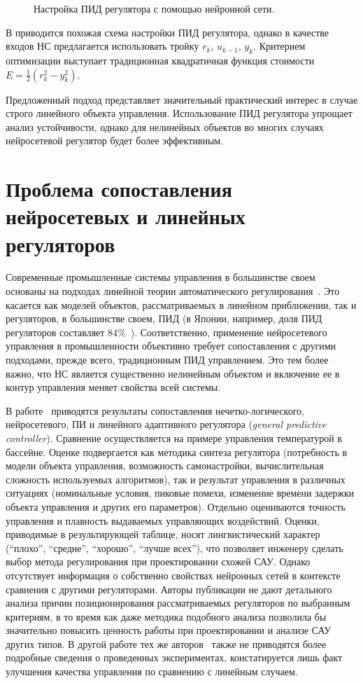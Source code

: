 \begin{figure}[h]
  \centering
  
  \caption{Настройка ПИД регулятора с помощью нейронной сети.}
  \label{fig:nn-tunes-pid}
\end{figure}

В \cite{sigom00} приводится похожая схема настройки ПИД регулятора,
однако в качестве входов НС предлагается использовать тройку $r_k$,
$u_{k-1}$, $y_k$.  Критерием оптимизации выступает традиционная
квадратичная функция стоимости $E=\frac{1}{2}(r_k^2-y_k^2)$.

Предложенный подход представляет значительный практический интерес в
случае строго линейного объекта управления.  Использование ПИД
регулятора упрощает анализ устойчивости, однако для нелинейных
объектов во многих случаях нейросетевой регулятор будет более
эффективным.


\section{Проблема сопоставления нейросетевых и линейных регуляторов}

Современные промышленные системы управления в большинстве своем
основаны на подходах линейной теории автоматического
регулирования~\cite{warwick96}.  Это касается как моделей объектов,
рассматриваемых в линейном приближении, так и регуляторов, в
большинстве своем, ПИД (в Японии, например, доля ПИД регуляторов
составляет 84\%~\cite{sigom00}).  Соответственно, применение
нейросетевого управления в промышленности объективно требует
сопоставления с другими подходами, прежде всего, традиционным ПИД
управлением.  Это тем более важно, что НС является существенно
нелинейным объектом и включение ее в контур управления меняет свойства
всей системы.

В работе~\cite{khomyu96} приводятся результаты сопоставления
нечетко-логического, {нейросете\-во\-го}, ПИ и линейного адаптивного
регулятора ({\em general predictive controller}).  Сравнение
осуществляется на примере управления температурой в бассейне.  Оценке
подвергается как методика синтеза регулятора (потребность в модели
объекта управления, возможность самонастройки, вычислительная
сложность используемых алгоритмов), так и результат управления в
различных ситуациях (номинальные условия, пиковые помехи, изменение
времени задержки объекта управления и других его параметров).
Отдельно оцениваются точность управления и плавность выдаваемых
управляющих воздействий.  Оценки, приводимые в результирующей таблице,
носят лингвистический характер (``плохо'', ``средне'', ``хорошо'',
``лучше всех''), что позволяет инженеру сделать выбор метода
регулирования при проектировании схожей САУ.  Однако отсутствует
информация о собственно свойствах нейронных сетей в контексте
сравнения с другими регуляторами.  Авторы публикации не дают
детального анализа причин позиционирования рассматриваемых регуляторов
по выбранным критериям, в то время как даже методика подобного анализа
позволила бы значительно повысить ценность работы при проектировании и
анализе САУ других типов.  В другой работе тех же
авторов~\cite{sigom00} также не приводятся более подробные сведения о
проведенных экспериментах, констатируется лишь факт улучшения качества
управления по сравнению с линейным случаем.

